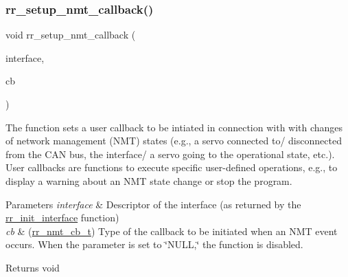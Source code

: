 \subsubsection{\texorpdfstring{rr\+\_\+setup\+\_\+nmt\+\_\+callback()}{rr\_setup\_nmt\_callback()}}
{\footnotesize\ttfamily void rr\+\_\+setup\+\_\+nmt\+\_\+callback (\begin{DoxyParamCaption}\item[{\hyperlink{structrr__can__interface__t}{rr\+\_\+can\+\_\+interface\+\_\+t} $\ast$}]{interface,  }\item[{\hyperlink{api_8h_ae0f9f2b200672126bb1f6eb3e66c27fc}{rr\+\_\+nmt\+\_\+cb\+\_\+t}}]{cb }\end{DoxyParamCaption})}



The function sets a user callback to be intiated in connection with with changes of network management (N\+MT) states (e.\+g., a servo connected to/ disconnected from the C\+AN bus, the interface/ a servo going to the operational state, etc.). User callbacks are functions to execute specific user-\/defined operations, e.\+g., to display a warning about an N\+MT state change or stop the program. 


\begin{DoxyParams}{Parameters}
{\em interface} & Descriptor of the interface (as returned by the \hyperlink{group___init_ga472a4890dcc7d7a13123c56a06946d91}{rr\+\_\+init\+\_\+interface} function) \\
\hline
{\em cb} & (\hyperlink{api_8h_ae0f9f2b200672126bb1f6eb3e66c27fc}{rr\+\_\+nmt\+\_\+cb\+\_\+t}) Type of the callback to be initiated when an N\+MT event occurs. When the parameter is set to \char`\"{}\+N\+U\+L\+L,\char`\"{} the function is disabled. \\
\hline
\end{DoxyParams}
\begin{DoxyReturn}{Returns}
void 
\end{DoxyReturn}
